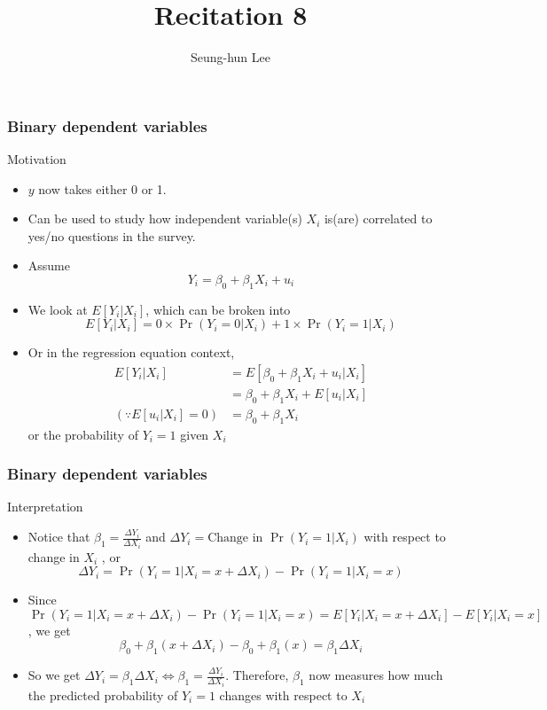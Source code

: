 \documentclass[compress]{beamer}
\title[Recitation 8]{Recitation 8} %
\author[Seung-hun Lee]{Seung-hun Lee}
\institute[Columbia University]{Columbia University}
\date[]{}
\begin{document}
\begin{frame}
\titlepage
\end{frame}



\begin{frame}
\frametitle{Binary dependent variables}
Motivation
\begin{itemize}
\item $y$ now  takes either 0 or 1.
\item Can be used to study how independent variable(s) $X_i$ is(are) correlated to yes/no questions in the survey.
\item Assume 
\[
Y_i = \beta_0 + \beta_1 X_i +u_i
\]
\item We look at $E[Y_i|X_i]$, which can be broken into 
\[
E[Y_i|X_i] = 0\times\Pr(Y_i=0|X_i)+1\times\Pr(Y_i=1|X_i)
\]
\item Or in the regression equation context, 
\[
\begin{aligned}
E[Y_i|X_i]&=E[\beta_0+\beta_1X_i+u_i|X_i]\\
&=\beta_0 + \beta_1X_i + E[u_i|X_i]\\
(\because  E[u_i|X_i]=0)&=\beta_0 + \beta_1X_i 
\end{aligned}
\]
or the probability of $Y_i=1$ given $X_i$
\end{itemize}
\end{frame}

\begin{frame}
\frametitle{Binary dependent variables}
Interpretation
\begin{itemize}
\item Notice that $\beta_1 =\frac{\Delta Y_i}{\Delta X_i}$ and $\Delta Y_i = \text{Change in }\Pr(Y_i=1|X_i)$ with respect to change in $X_i$ , or
\[
\Delta Y_i = \Pr(Y_i=1|X_i=x+\Delta X_i)-\Pr(Y_i=1|X_i=x)
\]
\item Since $\Pr(Y_i=1|X_i=x+\Delta X_i)-\Pr(Y_i=1|X_i=x)=E[Y_i|X_i=x+\Delta X_i]-E[Y_i|X_i=x]$, we get
\[
\beta_0+\beta_1(x+\Delta X_i)-\beta_0+\beta_1(x) =\beta_1 \Delta X_i
\]
\item So we get $\Delta Y_i = \beta_1\Delta X_i\iff\beta_1 =\frac{\Delta Y_i}{\Delta X_i}$. Therefore, $\beta_1$ now measures how much the predicted probability of $Y_i=1$ changes with respect to $X_i$
\end{itemize}
\end{frame}
\end{document}
